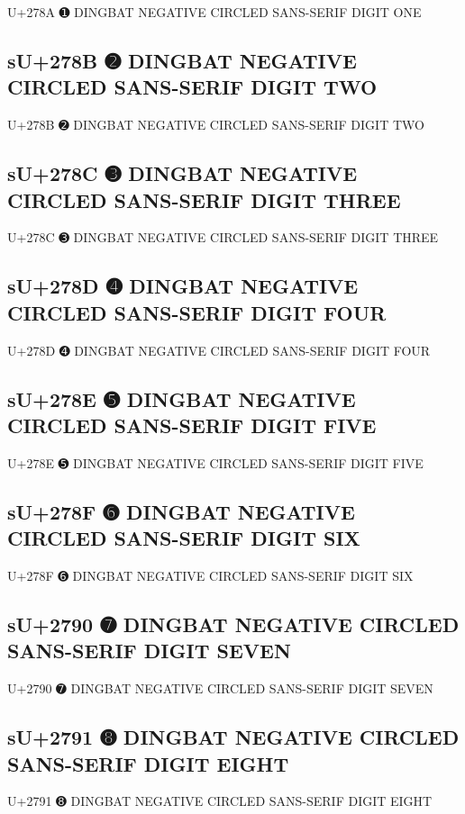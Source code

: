 U+278A ➊ DINGBAT NEGATIVE CIRCLED SANS-SERIF DIGIT ONE

\subsection{sU+278B ➋ DINGBAT NEGATIVE CIRCLED SANS-SERIF DIGIT TWO}

U+278B ➋ DINGBAT NEGATIVE CIRCLED SANS-SERIF DIGIT TWO

\subsection{sU+278C ➌ DINGBAT NEGATIVE CIRCLED SANS-SERIF DIGIT THREE}

U+278C ➌ DINGBAT NEGATIVE CIRCLED SANS-SERIF DIGIT THREE

\subsection{sU+278D ➍ DINGBAT NEGATIVE CIRCLED SANS-SERIF DIGIT FOUR}

U+278D ➍ DINGBAT NEGATIVE CIRCLED SANS-SERIF DIGIT FOUR

\subsection{sU+278E ➎ DINGBAT NEGATIVE CIRCLED SANS-SERIF DIGIT FIVE}

U+278E ➎ DINGBAT NEGATIVE CIRCLED SANS-SERIF DIGIT FIVE

\subsection{sU+278F ➏ DINGBAT NEGATIVE CIRCLED SANS-SERIF DIGIT SIX}

U+278F ➏ DINGBAT NEGATIVE CIRCLED SANS-SERIF DIGIT SIX

\subsection{sU+2790 ➐ DINGBAT NEGATIVE CIRCLED SANS-SERIF DIGIT SEVEN}

U+2790 ➐ DINGBAT NEGATIVE CIRCLED SANS-SERIF DIGIT SEVEN

\subsection{sU+2791 ➑ DINGBAT NEGATIVE CIRCLED SANS-SERIF DIGIT EIGHT}

U+2791 ➑ DINGBAT NEGATIVE CIRCLED SANS-SERIF DIGIT EIGHT

